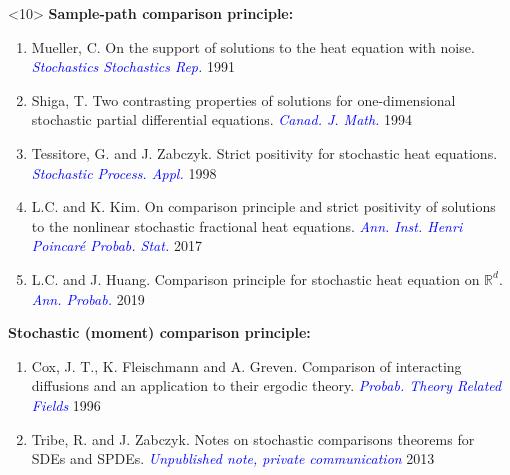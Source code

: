 \documentclass[9pt,table,xcolor=dvipsnames]{beamer}%
\newcommand{\R}{\mathbb{R}}
\theoremstyle{definition}
\theoremstyle{plain}
\begin{document}
\begin{frame}<10>
\footnotesize
{\bf\noindent Sample-path comparison principle:}
\begin{enumerate}
  \item \textcolor{yellow!75!black}{Mueller, C.} On the support of solutions to the heat equation with noise.                                                                                                             \textcolor{blue}{ \it Stochastics Stochastics Rep.              } 1991
  \item \textcolor{yellow!75!black}{Shiga, T.} Two contrasting properties of solutions for one-dimensional stochastic partial differential equations.                                                                     \textcolor{blue}{ \it Canad. J. Math.                           } 1994
  \item \textcolor{yellow!75!black}{Tessitore, G.} and \textcolor{yellow!75!black}{J. Zabczyk}. Strict positivity for stochastic heat equations.                                                                                   \textcolor{blue}{ \it Stochastic Process. Appl.                 } 1998
  \item[ \textcolor{magenta}{\bf 4.} ]\textcolor{yellow!75!black}{L.C.} and \textcolor{yellow!75!black}{K. Kim}. On comparison principle and strict positivity of solutions to the nonlinear stochastic fractional heat equations. \textcolor{blue}{ \it Ann. Inst. Henri Poincar\'e Probab. Stat. } 2017
  \item[ \textcolor{magenta}{\bf 5.} ] \textcolor{yellow!75!black}{L.C.} and \textcolor{yellow!75!black}{J. Huang.} Comparison principle for stochastic heat equation on $\R^d$.                                                   \textcolor{blue}{ \it Ann. Probab.                              } 2019
\end{enumerate}
\vfill
{\bf\noindent Stochastic (moment) comparison principle:}
\begin{enumerate}
  \item \textcolor{yellow!75!black}{Cox, J. T.}, \textcolor{yellow!75!black}{K. Fleischmann} and \textcolor{yellow!75!black}{A. Greven}. Comparison of interacting diffusions and an application to their ergodic theory.                  \textcolor{blue}{ \it Probab. Theory Related Fields           }1996
  \item \textcolor{yellow!75!black}{Tribe, R.} and \textcolor{yellow!75!black}{J. Zabczyk}. Notes on stochastic comparisons theorems for SDEs and SPDEs.                                                                          \textcolor{blue}{ \it Unpublished note, private communication }2013

\end{enumerate}
\end{frame}
\end{document}
